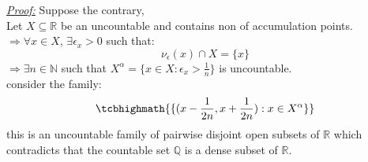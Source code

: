 \documentclass{amsbook}
\begin{document}

\begin{tcolorbox}[enhanced,attach boxed title to top center={yshift=-3mm,yshifttext=-1mm},
  colback=blue!5!white,colframe=blue!75!black,colbacktitle=red!80!black,
  title=Exercise 38.5(c):,fonttitle=\bfseries,
  boxed title style={size=small,colframe=red!50!black} ]
 \textit{\color{blue}\underline{Proof:}} Suppose the contrary,\\
 Let $X\subseteq\mathbb{R}$ be an uncountable and contains non of accumulation points.\\
 $\Rightarrow\forall x\in X$, $\exists \epsilon_x>0$ such that:
 $$\nu_\epsilon (x)\cap X=\{x\}$$
 $\Rightarrow\exists n\in \mathbb{N}$ such that $X^\alpha=\{x\in X: \epsilon_x>\frac{1}{n}\}$ is uncountable.\\
 consider the family:
 $$\tcbhighmath{\{(x-\frac{1}{2n},x+\frac{1}{2n}):x\in X^\alpha\}}$$
 this is an uncountable family of pairwise disjoint open subsets of $\mathbb{R}$ which contradicts that the 
 countable set $\mathbb{Q}$ is a dense subset of
 $\mathbb{R}$.

\end{tcolorbox}

\end{document}
